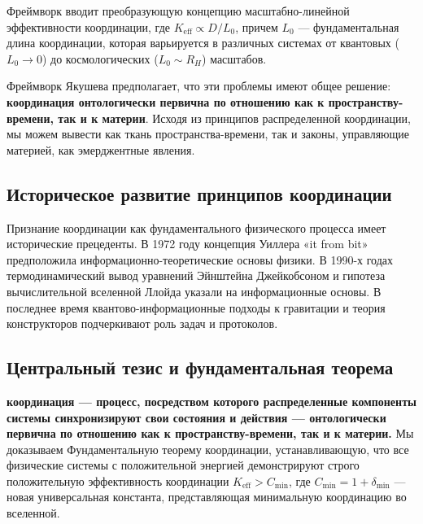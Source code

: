 \documentclass[11pt,a4paper]{article}
\begin{document}
	Фреймворк вводит преобразующую концепцию масштабно-линейной эффективности координации,
	где $K_{\mathrm{eff}} \propto D/L_0$, причем $L_0$ — фундаментальная длина координации, которая варьируется в различных системах от квантовых ($L_0 \to 0$) до космологических ($L_0 \sim R_H$) масштабов.
	
	
	Фреймворк Якушева предполагает, что эти проблемы имеют общее решение: \textbf{координация онтологически первична по отношению как к пространству-времени, так и к материи}. Исходя из принципов распределенной координации, мы можем вывести как ткань пространства-времени, так и законы, управляющие материей, как эмерджентные явления.
	
	\subsection{Историческое развитие принципов координации}
	Признание координации как фундаментального физического процесса имеет исторические прецеденты. В 1972 году концепция Уиллера «it from bit» предположила информационно-теоретические основы физики. В 1990-х годах термодинамический вывод уравнений Эйнштейна Джейкобсоном и гипотеза вычислительной вселенной Ллойда указали на информационные основы. В последнее время квантово-информационные подходы к гравитации и теория конструкторов подчеркивают роль задач и протоколов.
	\subsection{Центральный тезис и фундаментальная теорема}
	
	\noindent
	\textbf{координация — процесс, посредством которого распределенные компоненты системы синхронизируют свои состояния и действия — онтологически первична по отношению как к пространству-времени, так и к материи.} Мы доказываем Фундаментальную теорему координации, устанавливающую, что все физические системы с положительной энергией демонстрируют строго положительную эффективность координации $K_{\mathrm{eff}} > C_{\min}$, где $C_{\min} = 1 + \delta_{\min}$ — новая универсальная константа, представляющая минимальную координацию во вселенной.
	
\end{document}
